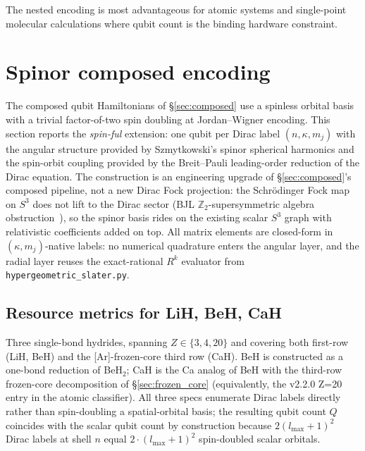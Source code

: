 \documentclass[aps,pra,twocolumn,superscriptaddress,longbibliography]{revtex4-2}
\begin{document}
The nested encoding is most advantageous for atomic systems and
single-point molecular calculations where qubit count is the binding
hardware constraint.



\section{Spinor composed encoding}
\label{sec:spinor_composed}

The composed qubit Hamiltonians of \S\ref{sec:composed} use a spinless
orbital basis with a trivial factor-of-two spin doubling at
Jordan--Wigner encoding. This section reports the
\emph{spin-ful} extension: one qubit per Dirac label $(n, \kappa, m_j)$
with the angular structure provided by Szmytkowski's spinor spherical
harmonics and the spin-orbit coupling provided by the Breit--Pauli
leading-order reduction of the Dirac equation.
The construction is an engineering upgrade of
\S\ref{sec:composed}'s composed pipeline, not a new Dirac Fock
projection: the Schr\"odinger Fock map on $S^3$ does not lift to the
Dirac sector (BJL $\mathbb{Z}_2$-supersymmetric algebra
obstruction~\cite{BJL}), so the spinor basis rides on the existing
scalar $S^3$ graph with relativistic coefficients added on top. All
matrix elements are closed-form in $(\kappa, m_j)$-native labels: no
numerical quadrature enters the angular layer, and the radial layer
reuses the exact-rational $R^k$ evaluator from
\texttt{hypergeometric\_slater.py}.

\subsection{Resource metrics for LiH, BeH, CaH}
\label{subsec:spinor_resource}

Three single-bond hydrides, spanning $Z \in \{3, 4, 20\}$ and covering
both first-row (LiH, BeH) and the [Ar]-frozen-core third row (CaH).
BeH is constructed as a one-bond reduction of BeH$_2$; CaH is the
Ca analog of BeH with the third-row frozen-core decomposition of
\S\ref{sec:frozen_core} (equivalently, the v2.2.0 Z=20 entry in the
atomic classifier). All three specs enumerate Dirac labels directly
rather than spin-doubling a spatial-orbital basis; the resulting
qubit count $Q$ coincides with the scalar qubit count by construction
because $2(l_{\max}+1)^2$ Dirac labels at shell $n$ equal
$2 \cdot (l_{\max}+1)^2$ spin-doubled scalar orbitals.
\end{document}
